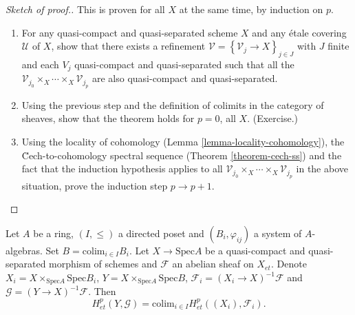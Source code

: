 \begin{proof}[Sketch of proof.]
This is proven for all $X$ at the same time, by induction on $p$. 
\begin{enumerate}
\item 
For any quasi-compact and quasi-separated scheme $X$ and any \'etale covering 
$\mathcal{U}$ of $X$, show that there exists a refinement $\mathcal{V} 
=\left\{\mathcal{V}_j \to X\right\}_{j\in J}$ with $J$ finite and each $V_j$ 
quasi-compact and quasi-separated such that all the $\mathcal{V}_{j_0} \times_X 
\cdots \times_X \mathcal{V}_{j_p}$ are also quasi-compact and quasi-separated. 
\item 
Using the previous step and the definition of colimits in the category of 
sheaves, show that the theorem holds for $p=0$, all $X$. (Exercise.)
\item 
Using the locality of cohomology
(Lemma \ref{lemma-locality-cohomology}),
the \u Cech-to-cohomology spectral sequence
(Theorem \ref{theorem-cech-ss}) and the fact that the induction 
hypothesis applies to all $\mathcal{V}_{j_0}\times_X \cdots \times_X 
\mathcal{V}_{j_p}$ in the above situation, prove the induction step $p\to p+1$. 
\end{enumerate}
\end{proof}

\begin{theorem}
\label{theorem-directed-colimit-cohomology}
Let $A$ be a ring, $(I, \leq)$ a directed poset and $(B_i, \varphi_{ij})$ a 
system of $A$-algebras. Set $B=\text{colim}_{i\in I} B_i$. Let $X \to 
\text{Spec} A$ be a quasi-compact and quasi-separated morphism of schemes and 
$\mathcal{F}$ an abelian sheaf on $X_{et}$. Denote $X_i = X\times_{\text{Spec} 
A} \text{Spec} B_i$,  $Y= X \times_{\text{Spec} A}\text{Spec} B$, 
$\mathcal{F}_i = (X_i\to X)^{-1}\mathcal{F}$ and $\mathcal{G} = (Y\to 
X)^{-1}\mathcal{F}$. Then
$$
H_{et}^p(Y, \mathcal{G}) = \text{colim}_{i\in I} H_{et}^p ((X_i), 
\mathcal{F}_i).
$$
\end{theorem}

